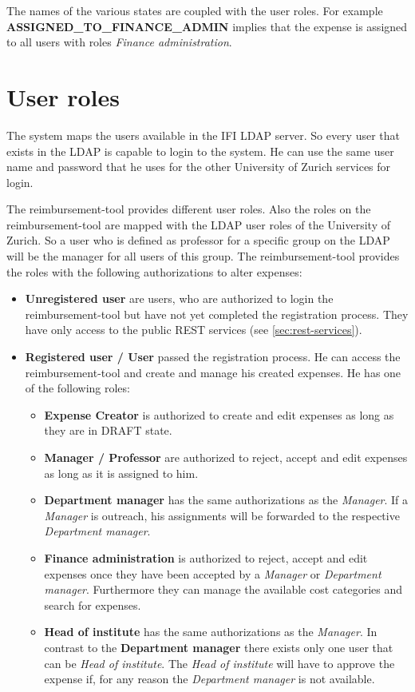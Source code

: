 The names of the various states are coupled with the user roles. For example \textbf{ASSIGNED\_TO\_FINANCE\_ADMIN} implies that the expense is assigned to all users with roles \textit{Finance administration}.

\section{User roles}
\label{user-roles}

The system maps the users available in the IFI LDAP server. So every user that exists in the LDAP is capable to login to the system. He can use the same user name and password that he uses for the other University of Zurich services for login. \par

The reimbursement-tool provides different user roles. Also the roles on the reimbursement-tool are mapped with the LDAP user roles of the University of Zurich. So a user who is defined as professor for a specific group on the LDAP will be the manager for all users of this group. The reimbursement-tool provides the roles with the following authorizations to alter expenses:

\begin{itemize}
	\item \textbf{Unregistered user} are users, who are authorized to login the reimbursement-tool but have not yet completed the registration process. They have only access to the public REST services (see \ref{sec:rest-services}).
	\item \textbf{Registered user / User} passed the registration process. He can access the reimbursement-tool and create and manage his created expenses. He has one of the following roles:
	
	\begin{itemize}
		\item \textbf{Expense Creator} is authorized to create and edit expenses as long as they are in DRAFT state.
		
		\item \textbf{Manager / Professor} are authorized to reject, accept and edit expenses as long as it is assigned to him.
		
		\item \textbf{Department manager} has the same authorizations as the \textit{Manager}. If a \textit{Manager} is outreach, his assignments will be forwarded to the respective \textit{Department manager}.
		
		\item \textbf{Finance administration} is authorized to reject, accept and edit expenses once they have been accepted by a \textit{Manager} or \textit{Department manager}. Furthermore they can manage the available cost categories and search for expenses.
		
		\item \textbf{Head of institute} has the same authorizations as the \textit{Manager}. In contrast to the \textbf{Department manager} there exists only one user that can be \textit{Head of institute}. The \textit{Head of institute} will have to approve the expense if, for any reason the \textit{Department manager} is not available.
	\end{itemize}
\end{itemize}

